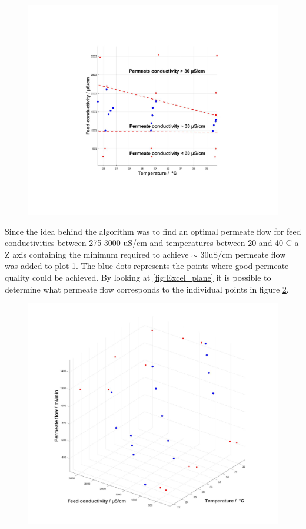 \begin{figure}[H]
    \centering
    \includegraphics[width=1.1\textwidth]{FinalResult_1}
    \caption{}
    \label{fig:FinalResult_1}
\end{figure}

\newpage

Since the idea behind the algorithm was to find an optimal permeate flow for feed conductivities between 275-3000 uS/cm and temperatures between 20 and 40 C a Z axis containing the minimum required to achieve $\sim$ 30uS/cm permeate flow was added to plot \ref{fig:FinalResult_1}. The blue dots represents the points where good permeate quality could be achieved. By looking at  \ref{fig:Excel_plane} it is possible to determine what permeate flow corresponds to the individual points in figure  \ref{fig:FinalResult_2}.

\begin{figure}[H]
    \centering
    \includegraphics[width=1.1\textwidth]{FinalResult_2}
    \caption{}
    \label{fig:FinalResult_2}
\end{figure}

